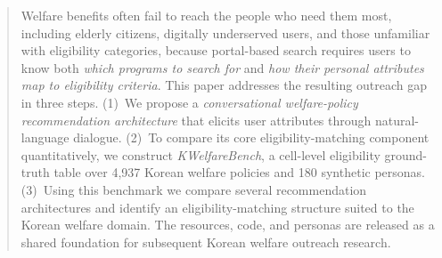 \documentclass{article}
\begin{document}

\begin{abstract}
Welfare benefits often fail to reach the people who need them most,
including elderly citizens, digitally underserved users, and those
unfamiliar with eligibility categories, because portal-based search
requires users to know both \emph{which programs to search for} and
\emph{how their personal attributes map to eligibility criteria}.
This paper addresses the resulting outreach gap in three steps.
(1)~We propose a \emph{conversational welfare-policy recommendation
architecture} that elicits user attributes through natural-language
dialogue. (2)~To compare its core eligibility-matching component
quantitatively, we construct \emph{KWelfareBench}, a cell-level
eligibility ground-truth table over 4{,}937 Korean welfare policies
and 180 synthetic personas. (3)~Using this benchmark we compare
several recommendation architectures and identify an
eligibility-matching structure suited to the Korean welfare domain.
The resources, code, and personas are released as a shared
foundation for subsequent Korean welfare outreach research.
\end{abstract}

\end{document}
